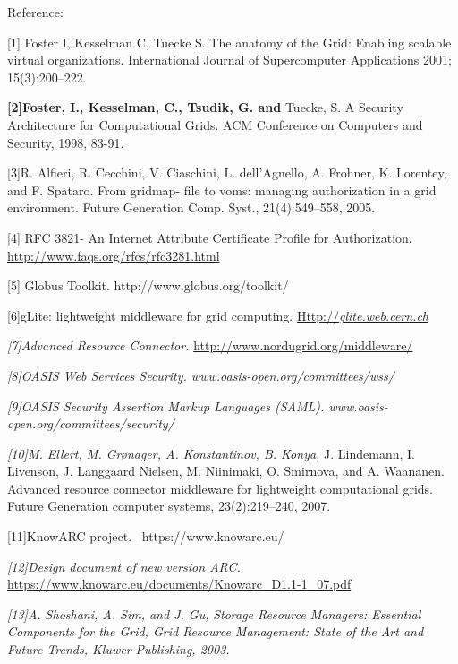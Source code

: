 \documentclass{article}
\newcommand\textstyleStrongEmphasis[1]{\textbf{#1}}
\newcommand\textstyleCitation[1]{\textit{#1}}
\begin{document}
\bigskip

Reference:

[1] Foster I, Kesselman C, Tuecke S. The anatomy of the Grid: Enabling
scalable virtual organizations. International Journal of Supercomputer
Applications 2001; 15(3):200--222. 

\textstyleStrongEmphasis{\textmd{[2]}}\textstyleStrongEmphasis{\textmd{Foster,
I., Kesselman, C., Tsudik, G. and }}Tuecke, S. A Security Architecture
for Computational Grids. ACM Conference on Computers and Security,
1998, 83-91.

[3]R. Alfieri, R. Cecchini, V. Ciaschini, L.
dell{\textquoteright}Agnello, A. Frohner, K. Lorentey, and F. Spataro.
From gridmap- file to voms: managing authorization in a grid
environment. Future Generation Comp. Syst., 21(4):549--558, 2005. 

[4] RFC 3821- An Internet Attribute Certificate Profile for
Authorization. \url{http://www.faqs.org/rfcs/rfc3281.html}

[5] Globus Toolkit. http://www.globus.org/toolkit/

[6]gLite: lightweight middleware for grid computing.
\href{http://glite.web.cern.ch/}{Http://}\href{http://glite.web.cern.ch/}{\textstyleCitation{\textup{glite.web.cern.ch}}}

\textstyleCitation{\textup{[7]Advanced Resource Connector.
}}\url{http://www.nordugrid.org/middleware/}

\textstyleCitation{\textup{[8]OASIS Web Services Security.
www.oasis-open.org/committees/wss/}}

\textstyleCitation{\textup{[9]OASIS Security Assertion Markup Languages
(SAML). www.oasis-open.org/committees/security/}}

\textstyleCitation{\textup{[10]}}\textstyleCitation{\textup{M. Ellert,
M. Gr{\o}nager, A. Konstantinov, B. Konya, }}J. Lindemann, I. Livenson,
J. Langgaard Nielsen, M. Niinimaki, O. Smirnova, and A. Waananen.
Advanced resource connector middleware for lightweight computational
grids. Future Generation computer systems, 23(2):219--240, 2007.

[11]KnowARC project. \ https://www.knowarc.eu/

\textstyleCitation{\textup{[12]Design document of new version ARC.
}}\url{https://www.knowarc.eu/documents/Knowarc_D1.1-1_07.pdf}

\textstyleCitation{\textup{[13]A. Shoshani, A. Sim, and J. Gu,
}}\textstyleCitation{Storage Resource Managers: Essential Components
for the Grid}\textstyleCitation{\textup{, Grid Resource Management:
State of the Art and Future Trends, Kluwer Publishing, 2003.}}
\end{document}
